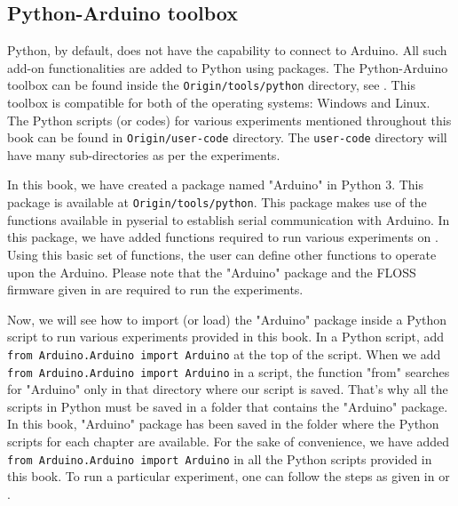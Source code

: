 



\subsection{Python-Arduino toolbox}
\label{sec:python-toolbox}
Python, by default, does not have the capability to connect to Arduino. 
All such add-on functionalities are added to Python using packages. 
The Python-Arduino toolbox can be found inside the {\tt Origin/tools/python} directory, 
see .  This toolbox is compatible for both of the operating systems: Windows and Linux. 
The Python scripts (or codes) for various experiments mentioned throughout this book can be found in 
{\tt Origin/user-code} directory. The {\tt user-code} directory will have many sub-directories as per the experiments. 

In this book, we have created a package named "Arduino" in Python 3.  This package is available at 
{\tt Origin/tools/python}. This package makes use of the functions available in pyserial \cite{pySerial} to 
establish serial communication with Arduino. In this package, we have added functions required to run 
various experiments on \arduino. Using this basic set of functions, the user can define other functions to operate
upon the Arduino. Please note that the "Arduino" package and the FLOSS firmware  given 
in  are required to run the experiments. 

Now, we will see how to import (or load) the "Arduino" package inside a Python script to run 
various experiments provided in this book. In a Python script, add {\tt from Arduino.Arduino import Arduino} 
at the top of the script. When we add {\tt from Arduino.Arduino import Arduino} in a script, the function "from" 
searches for "Arduino" only in that directory where our script is saved. That's why all the scripts in Python 
must be saved in a folder that contains the "Arduino" package. In this book, "Arduino" package has been saved 
in the folder where the Python scripts for each chapter are available. For the sake of convenience, we have 
added {\tt from Arduino.Arduino import Arduino} in all the Python scripts provided in this book. 
To run a particular experiment, one can follow the steps as given in  or . 


